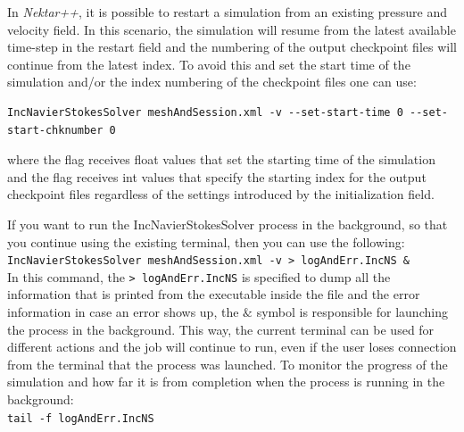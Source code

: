 In \emph{Nektar++}, it is possible to restart a simulation from an existing pressure and velocity field. In this scenario, the simulation will resume from the latest available time-step in the restart field and the numbering of the output checkpoint files will continue from the latest index. To avoid this and set the start time of the simulation and/or the index numbering of the checkpoint files one can use: 
\begin{lstlisting}[style=BashInputStyle]
IncNavierStokesSolver meshAndSession.xml -v --set-start-time 0 --set-start-chknumber 0
\end{lstlisting}
%
where the flag  receives float values that set the starting time of the simulation and the flag  receives int values that specify the starting index for the output checkpoint files regardless of the settings introduced by the initialization field.
%
\begin{notebox}
If you want to run the IncNavierStokesSolver process in the background, so that you continue using the existing terminal, then you can use the following: \\ 
\texttt{IncNavierStokesSolver meshAndSession.xml -v > logAndErr.IncNS \&} \\
%
In this command, the \texttt{> logAndErr.IncNS} is specified to dump all the information that is printed from the executable inside the  file and the error information in case an error shows up, the $\&$ symbol is responsible for launching the process in the background. This way, the current terminal can be used for different actions and the job will continue to run, even if the user loses connection from the terminal that the process was launched. To monitor the progress of the simulation and how far it is from completion when the process is running in the background: \\
\texttt{tail -f logAndErr.IncNS}
\end{notebox}

